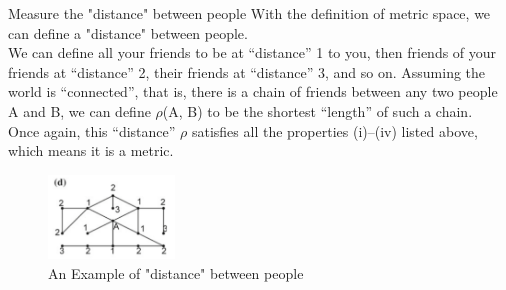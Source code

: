 \documentclass[xcolor=dvipsnames]{beamer}
\theoremstyle{remark}
\begin{document}
\begin{frame}{Measure the "distance" between people}
  \hspace*{1em}With the definition of metric space, we can define a "distance" between people.\\
  \hspace*{1em}We can define all your friends to be at “distance” 1 to you, then friends of your friends at “distance” 2, their friends at “distance” 3, and so on. Assuming the world is “connected”, that is, there is a chain of friends between any two people A and B, we can define $\rho$(A, B) to be the shortest “length” of such a chain. \\
  \hspace*{1em}Once again, this “distance” $\rho$ satisfies all the properties (i)–(iv) listed above, which means it is a metric. \\
  \begin{figure}[H] %
    \centering       %
    \includegraphics[width=0.3\textwidth]{fig2.png} %
    \caption{An Example of "distance" between people} %
    \label{Fig2}   %
\end{figure}
\end{frame}
\end{document}
